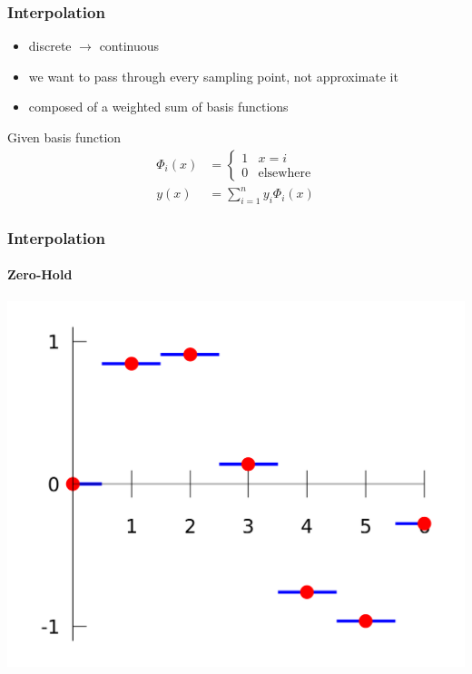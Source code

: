 \documentclass[aspectratio=169]{beamer}
\begin{document}
\begin{frame}
    \frametitle{Interpolation}

    \begin{itemize}
        \item discrete \(\to\) continuous
        \item we want to pass through every sampling point, not approximate it
        \item composed of a weighted sum of basis functions
    \end{itemize}
    Given basis function
    \begin{align}
        \Phi_i(x) &=
        \begin{cases}
            1 & x = i \\
            0 & \text{elsewhere}
        \end{cases} \\
        y(x) &= \sum_{i = 1}^n y_i \Phi_i(x)
    \end{align}
\end{frame}

\begin{frame}
    \frametitle{Interpolation}
    \framesubtitle{Zero-Hold}

    \centering
    \includegraphics[height=0.9\textheight]{1280px-Piecewise_constant.svg.png}
\end{frame}
\end{document}
